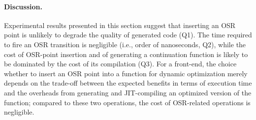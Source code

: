 \begin{description}
\paragraph{Discussion.}

Experimental results presented in this section suggest that inserting an OSR point is unlikely to degrade the quality of generated code (Q1). The time required to fire an OSR transition is negligible (i.e., order of nanoseconds, Q2), while the cost of OSR-point insertion and of generating a continuation function 
is likely to be dominated by the cost of its compilation (Q3). For a front-end, the choice whether to insert an OSR point into a function for dynamic optimization merely depends on the trade-off between the expected benefits in terms of execution time and the overheads from generating and JIT-compiling an optimized version of the function; compared to these two operations, the cost of OSR-related operations is negligible.


\end{description}
